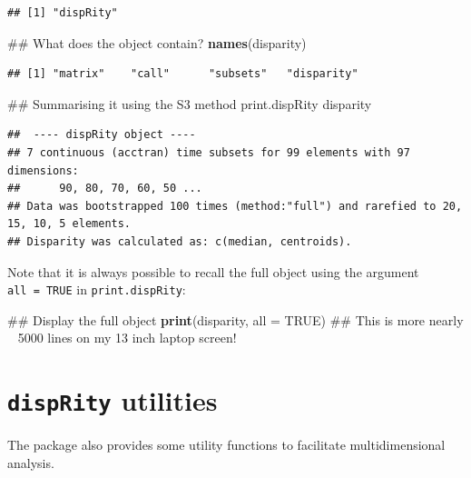 \documentclass[]{book}
\newenvironment{Shaded}{\begin{snugshade}}{\end{snugshade}}
\newcommand{\KeywordTok}[1]{\textcolor[rgb]{0.13,0.29,0.53}{\textbf{#1}}}
\newcommand{\DataTypeTok}[1]{\textcolor[rgb]{0.13,0.29,0.53}{#1}}
\newcommand{\OtherTok}[1]{\textcolor[rgb]{0.56,0.35,0.01}{#1}}
\newcommand{\NormalTok}[1]{#1}
\theoremstyle{definition}
\theoremstyle{definition}
\theoremstyle{remark}
\begin{document}
\begin{verbatim}
## [1] "dispRity"
\end{verbatim}

\begin{Shaded}
\begin{Highlighting}[]
\NormalTok{## What does the object contain?}
\KeywordTok{names}\NormalTok{(disparity)}
\end{Highlighting}
\end{Shaded}

\begin{verbatim}
## [1] "matrix"    "call"      "subsets"   "disparity"
\end{verbatim}

\begin{Shaded}
\begin{Highlighting}[]
\NormalTok{## Summarising it using the S3 method print.dispRity}
\NormalTok{disparity}
\end{Highlighting}
\end{Shaded}

\begin{verbatim}
##  ---- dispRity object ---- 
## 7 continuous (acctran) time subsets for 99 elements with 97 dimensions:
##      90, 80, 70, 60, 50 ...
## Data was bootstrapped 100 times (method:"full") and rarefied to 20, 15, 10, 5 elements.
## Disparity was calculated as: c(median, centroids).
\end{verbatim}

Note that it is always possible to recall the full object using the
argument \texttt{all\ =\ TRUE} in \texttt{print.dispRity}:

\begin{Shaded}
\begin{Highlighting}[]
\NormalTok{## Display the full object}
\KeywordTok{print}\NormalTok{(disparity, }\DataTypeTok{all =} \OtherTok{TRUE}\NormalTok{)}
\NormalTok{## This is more nearly ~ 5000 lines on my 13 inch laptop screen!}
\end{Highlighting}
\end{Shaded}

\section{\texorpdfstring{\texttt{dispRity}
utilities}{dispRity utilities}}\label{disprity-utilities}

The package also provides some utility functions to facilitate
multidimensional analysis.
\end{document}
